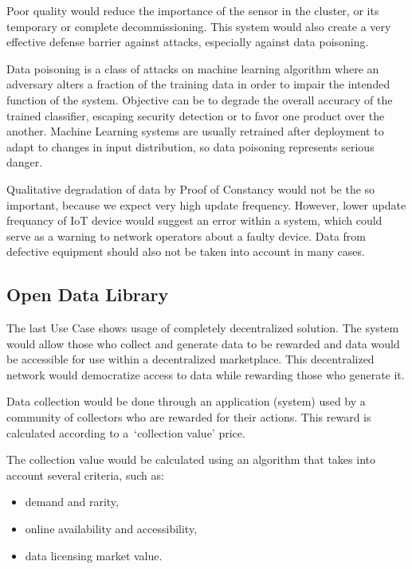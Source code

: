 Poor quality would reduce the importance of the sensor in the cluster, or its temporary or complete decommissioning.
This system would also create a very effective defense barrier against attacks, especially against data poisoning.

Data poisoning is a class of attacks on machine learning algorithm where an adversary alters a fraction of the training data in order to impair the intended function of the system.
Objective can be to degrade the overall accuracy of the trained classifier, escaping security detection or to favor one product over the another.
Machine Learning systems are usually retrained after deployment to adapt to changes in input distribution, so data poisoning represents serious danger.

Qualitative degradation of data by Proof of Constancy would not be the so important, because we expect very high update frequency.
However, lower update frequancy of IoT device would suggest an error within a system, which could serve as a warning to network operators about a faulty device.
Data from defective equipment should also not be taken into account in many cases.

\subsection{Open Data Library}

The last Use Case shows usage of completely decentralized solution.
The system would allow those who collect and generate data to be rewarded and data would be accessible for use within a decentralized marketplace.
This decentralized network would democratize access to data while rewarding those who generate it.

Data collection would be done through an application (system) used by a community of collectors who are rewarded for their actions.
This reward is calculated according to a~\enquote*{collection value} price.

The collection value would be calculated using an algorithm that takes into account several criteria, such as:
\begin{itemize}
    \item demand and rarity,
    \item online availability and accessibility,
    \item data licensing market value.
\end{itemize}

